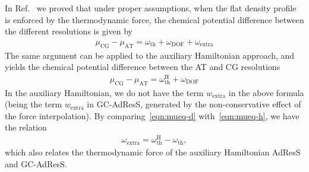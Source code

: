 \documentclass[a4paper,preprint,unsortedaddress]{revtex4-1}
\newcommand{\dof}{{\textrm{DOF}}}
\newcommand{\AT}{{\textrm{{AT}}}}
\newcommand{\CG}{{\textrm{CG}}}
\newcommand{\thf}{{\textrm{th}}}
\newcommand{\ext}{{\textrm{extra}}}
\newcommand{\hadress}{{\textrm{H}}}
\begin{document}
{In Ref.~\cite{prx} we proved that under proper assumptions,
when the flat density profile is enforced by the thermodynamic force,
the chemical potential difference between the different resolutions
is given by
\begin{align}\label{eqn:mueq-d}
 \mu_\CG - \mu_\AT =   \omega_\thf + \omega_\dof + \omega_\ext
\end{align}
The same argument can be applied to the auxiliary Hamiltonian approach,
and yields  the chemical potential difference between the AT and CG resolutions
\begin{align}\label{eqn:mueq-h}
 \mu_\CG - \mu_\AT =   \omega^\hadress_\thf + \omega_\dof 
\end{align}
In the auxiliary Hamiltonian, we do not have the term $w_\ext$ in the above
formula {(being the term $w_\ext$ in GC-AdResS, generated by the non-conservative effect of the force interpolation).}
By comparing~\eqref{eqn:mueq-d} with~\eqref{eqn:mueq-h}, we have the
relation
\begin{align}\label{eqn:hd-rel-2}
  \omega_\ext = \omega^\hadress_\thf - \omega_\thf,
\end{align}
which also relates the thermodynamic force of the auxiliary Hamiltonian AdResS
and GC-AdResS.\\


}
\end{document}
